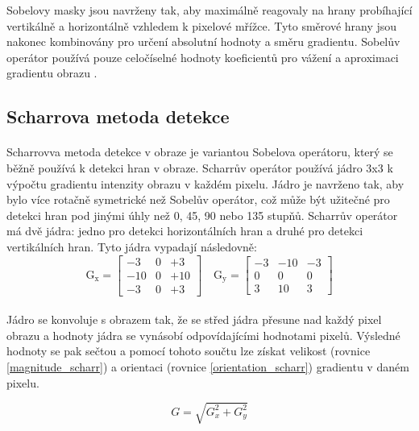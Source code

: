 Sobelovy masky jsou navrženy tak, aby maximálně reagovaly na hrany probíhající vertikálně a horizontálně vzhledem k pixelové mřížce. Tyto směrové hrany jsou nakonec kombinovány pro určení absolutní hodnoty a směru gradientu. Sobelův operátor používá pouze celočíselné hodnoty koeficientů pro vážení a aproximaci gradientu obrazu \cite{sobel}.

\subsection*{Scharrova metoda detekce}
\label{scharr}
\paragraph{}Scharrovva metoda detekce v obraze je variantou Sobelova operátoru, který se běžně používá k detekci hran v obraze. Scharrův operátor používá jádro 3x3 k výpočtu gradientu intenzity obrazu v každém pixelu. Jádro je navrženo tak, aby bylo více rotačně symetrické než Sobelův operátor, což může být užitečné pro detekci hran pod jinými úhly než 0, 45, 90 nebo 135 stupňů. Scharrův operátor má dvě jádra: jedno pro detekci horizontálních hran a druhé pro detekci vertikálních hran. Tyto jádra vypadají následovně:
\begin{equation}
\mathrm{G}_{\mathrm{x}}=\left[\begin{array}{lll}
-3 & 0 & +3 \\
-10 & 0 & +10 \\
-3 & 0 & +3
\end{array}\right] \quad \mathrm{G}_{\mathrm{y}}=\left[\begin{array}{ccc}
-3 & -10 & -3 \\
0 & 0 & 0 \\
3 & 10 & 3
\end{array}\right]
\end{equation}
\paragraph{} Jádro se konvoluje s obrazem tak, že se střed jádra přesune nad každý pixel obrazu a hodnoty jádra se vynásobí odpovídajícími hodnotami pixelů. Výsledné hodnoty se pak sečtou a pomocí tohoto součtu lze získat velikost (rovnice \ref{magnitude_scharr}) a orientaci (rovnice \ref{orientation_scharr}) gradientu v daném pixelu.

\begin{equation}\label{magnitude_scharr}
G = \sqrt{G_x^2 + G_y^2}
\end{equation}

